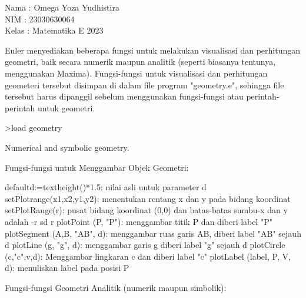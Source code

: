 \documentclass[a4paper,10pt]{article}
\begin{document}
\begin{eulernotebook}
\begin{eulercomment}
Nama  : Omega Yoza Yudhistira\\
NIM   : 23030630064\\
Kelas : Matematika E 2023



\begin{eulercomment}
\begin{eulercomment}
Euler menyediakan beberapa fungsi untuk melakukan visualisasi dan
perhitungan geometri, baik secara numerik maupun analitik (seperti
biasanya tentunya, menggunakan Maxima). Fungsi-fungsi untuk
visualisasi dan perhitungan geometeri tersebut disimpan di dalam file
program "geometry.e", sehingga file tersebut harus dipanggil sebelum
menggunakan fungsi-fungsi atau perintah-perintah untuk geometri.
\end{eulercomment}
\begin{eulerprompt}
>load geometry
\end{eulerprompt}
\begin{euleroutput}
  Numerical and symbolic geometry.
\end{euleroutput}
\begin{eulercomment}
Fungsi-fungsi untuk Menggambar Objek Geometri:

\end{eulercomment}
\begin{eulerttcomment}
  defaultd:=textheight()*1.5: nilai asli untuk parameter d
  setPlotrange(x1,x2,y1,y2): menentukan rentang x dan y pada bidang koordinat
  setPlotRange(r): pusat bidang koordinat (0,0) dan batas-batas sumbu-x dan y adalah -r sd r
  plotPoint (P, "P"): menggambar titik P dan diberi label "P"
  plotSegment (A,B, "AB", d): menggambar ruas garis AB, diberi label "AB" sejauh d
  plotLine (g, "g", d): menggambar garis g diberi label "g" sejauh d
  plotCircle (c,"c",v,d): Menggambar lingkaran c dan diberi label "c"
  plotLabel (label, P, V, d): menuliskan label pada posisi P
\end{eulerttcomment}
\begin{eulercomment}

Fungsi-fungsi Geometri Analitik (numerik maupun simbolik):


\end{eulercomment}
\end{eulercomment}
\end{eulercomment}
\end{eulernotebook}
\end{document}
